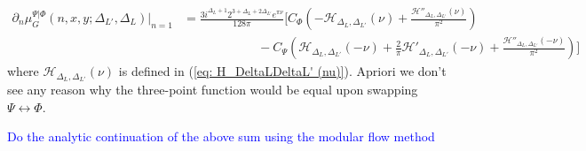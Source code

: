 \documentclass[11pt]{article}
\newcommand{\ep}{\epsilon}
\newcommand{\p}{\partial}
\newcommand{\nn}{\nonumber}
\newcommand{\lb}{\left(}
\newcommand{\rb}{\right)}
\newcommand{\NL}[1]{\textcolor{blue}{#1}}
\begin{document}
\begin{align}\label{eq: analytic continuation of muG three point large x mixture}
    \p_n\mu_G^{\Psi|\Phi} (n,x,y;\Delta_{L'},\Delta_L)|_{n=1} &= \frac{3i^{\Delta_L+1}2^{3+\Delta_L+2\Delta_{L'}}e^{\pi \nu}}{128\pi} \Bigg[ C_\Phi \lb -\mathcal{H}_{\Delta_L,\Delta_{L'}}(\nu) + \frac{\mathcal{H}''_{\Delta_L,\Delta_{L'}}(\nu)}{\pi^2} \rb \nn \\
    &\qquad\qquad\qquad- C_\Psi \lb \mathcal{H}_{\Delta_L,\Delta_{L'}}(-\nu) + \frac{2}{\pi}\mathcal{H}'_{\Delta_L,\Delta_{L'}}(-\nu)+\frac{\mathcal{H}''_{\Delta_L,\Delta_{L'}}(-\nu)}{\pi^2}\rb\Bigg]
\end{align}
where $\mathcal{H}_{\Delta_L,\Delta_{L'}}(\nu)$ is defined in (\ref{eq: H_DeltaLDeltaL' (nu)}). 
Apriori we don't see any reason why the three-point function would be equal upon swapping $\Psi \leftrightarrow \Phi$. 



\NL{Do the analytic continuation of the above sum using the modular flow method}


\end{document}
